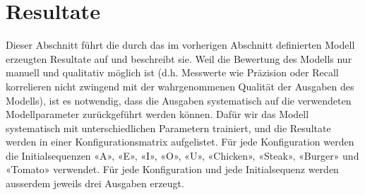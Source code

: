 \chapter{Resultate}
\label{ch:results}

Dieser Abschnitt führt die durch das im vorherigen Abschnitt definierten Modell erzeugten Resultate auf und beschreibt sie.
Weil die Bewertung des Modells nur manuell und qualitativ möglich ist (d.h. Messwerte wie Präzision oder Recall korrelieren nicht zwingend
mit der wahrgenommenen Qualität der Ausgaben des Modells), ist es notwendig, dass die Ausgaben systematisch auf die verwendeten
Modellparameter zurückgeführt werden können.
Dafür wir das Modell systematisch mit unterschiedlichen Parametern trainiert, und die Resultate werden in einer
Konfigurationsmatrix aufgelistet.
Für jede Konfiguration werden die Initialsequenzen «A», «E», «I», «O», «U», «Chicken», «Steak», «Burger» und «Tomato» verwendet.
Für jede Konfiguration und jede Initialsequenz werden ausserdem jeweils drei Ausgaben erzeugt.

